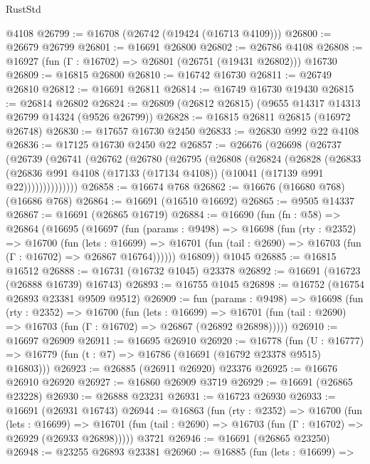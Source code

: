 \begin{lexlean}{RustStd}
\begin{coremodule}
    @4108
@26799 := @16708 (@26742 (@19424 (@16713 @4109)))
@26800 := @26679 @26799
@26801 := @16691 @26800
@26802 := @26786 @4108
@26808 := @16927 (fun (Γ : @16702) => @26801 (@26751 (@19431 @26802))) @16730
@26809 := @16815 @26800
@26810 := @16742 @16730
@26811 := @26749 @26810
@26812 := @16691 @26811
@26814 := @16749 @16730 @19430
@26815 := @26814 @26802
@26824 := @26809 (@26812 @26815) (@9655 @14317 @14313 @26799 @14324 (@9526 @26799))
@26828 := @16815 @26811 @26815 (@16972 @26748)
@26830 := @17657 @16730 @2450
@26833 := @26830 @992 @22 @4108
@26836 := @17125 @16730 @2450 @22
@26857 := @26676
    (@26698
      (@26737
        (@26739
          (@26741
            (@26762
              (@26780
                (@26795
                  (@26808
                    (@26824
                      (@26828
                        (@26833
                          (@26836
                            @991
                            @4108
                            (@17133 (@17134 @4108))
                            (@10041 (@17139 @991 @22))))))))))))))
@26858 := @16674 @768
@26862 := @16676 (@16680 @768) (@16686 @768)
@26864 := @16691 (@16510 @16692)
@26865 := @9505 @14337
@26867 := @16691 (@26865 @16719)
@26884 := @16690
    (fun (fn : @58) =>
    @26864
      (@16695
        (@16697
          (fun (params : @9498) =>
          @16698
            (fun (rty : @2352) =>
            @16700
              (fun (lets : @16699) =>
              @16701 (fun (tail : @2690) => @16703 (fun (Γ : @16702) => @26867 @16764))))))
        @16809))
    @1045
@26885 := @16815 @16512
@26888 := @16731 (@16732 @1045) @23378
@26892 := @16691 (@16723 (@26888 @16739) @16743)
@26893 := @16755 @1045
@26898 := @16752 (@16754 @26893 @23381 @9509 @9512)
@26909 := fun (params : @9498) =>
  @16698
    (fun (rty : @2352) =>
    @16700
      (fun (lets : @16699) =>
      @16701 (fun (tail : @2690) => @16703 (fun (Γ : @16702) => @26867 (@26892 @26898)))))
@26910 := @16697 @26909
@26911 := @16695 @26910
@26920 := @16778
    (fun (U : @16777) => @16779 (fun (t : @7) => @16786 (@16691 (@16792 @23378 @9515) @16803)))
@26923 := @26885 (@26911 @26920) @23376
@26925 := @16676 @26910 @26920
@26927 := @16860 @26909 @3719
@26929 := @16691 (@26865 @23228)
@26930 := @26888 @23231
@26931 := @16723 @26930
@26933 := @16691 (@26931 @16743)
@26944 := @16863
    (fun (rty : @2352) =>
    @16700
      (fun (lets : @16699) =>
      @16701 (fun (tail : @2690) => @16703 (fun (Γ : @16702) => @26929 (@26933 @26898)))))
    @3721
@26946 := @16691 (@26865 @23250)
@26948 := @23255 @26893 @23381
@26960 := @16885
    (fun (lets : @16699) =>

\end{coremodule}
\end{lexlean}
